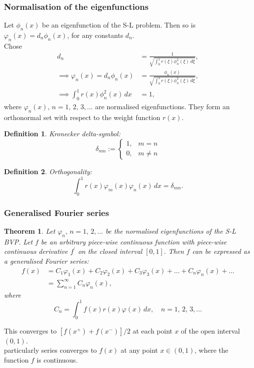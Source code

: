 \documentclass{article}
\newtheorem{theorem}{Theorem}
\newtheorem{definition}{Definition}
\begin{document}
\subsubsection{Normalisation of the eigenfunctions}
Let $\phi_n(x)$ be an eigenfunction of the S-L problem. Then  so is $\varphi_n(x)=d_n\phi_n(x)$, for any constants $d_n$.\\
Chose
\begin{align}
    d_n &= \frac{1}{\sqrt{\int_0^1 r(\xi)\phi_n^2(\xi)\,d\xi}},\\
    \implies \varphi_n(x) = d_n\phi_n(x) &= \frac{\phi_n(x)}{\sqrt{\int_0^1 r(\xi)\phi_n^2(\xi)\,d\xi}},\\
    \implies \int_0^1 r(x)\phi_n^2(x)\,dx &= 1,
\end{align}
where $\varphi_n(x),\,n=1,\,2,\,3,\ldots$ are normalised eigenfunctions. They form an orthonormal set with respect to the weight function $r(x)$.
\begin{definition}
    Kronecker delta-symbol:
    \begin{equation}
        \delta_{mn}:= \left\{ \begin{array}{cc}
            1, & m=n \\
            0, & m\neq n
        \end{array} \right.
    \end{equation}
\end{definition}
\begin{definition}
    Orthogonality:
    \begin{equation}
        \int_0^1 r(x) \varphi_m(x) \varphi_n(x)\,dx = \delta_{mn}.
    \end{equation}
\end{definition}
\subsubsection{Generalised Fourier series}
\begin{theorem}
    Let $\varphi_n,\,n=1,\,2,\ldots$ be the normalised eigenfunctions of the S-L BVP. Let $f$ be an arbitrary piece-wise continuous function with piece-wise continuous derivative $f^\prime$ on the closed interval $[0,1]$. Then $f$ can be expressed as a generalised Fourier series:
    \begin{align}
        f(x) &= C_1\varphi_1(x) + C_2\varphi_2(x) + C_3\varphi_3(x) +\ldots + C_n\varphi_n(x) + \ldots \nonumber \\
        &= \sum_{n=1}^\infty C_n\varphi_n(x),
    \end{align}
    where
    \begin{equation}
        C_n = \int_0^1 f(x)r(x)\varphi(x)\,dx,\quad n=1,\,2,\,3,\ldots
    \end{equation}
\end{theorem}
This converges to $[f(x^+) + f(x^-)]/2$ at each point $x$ of the open interval $(0,1)$.\\
particularly series converges to $f(x)$ at any point $x\in (0,1)$, where the function $f$ is continuous.
\end{document}
